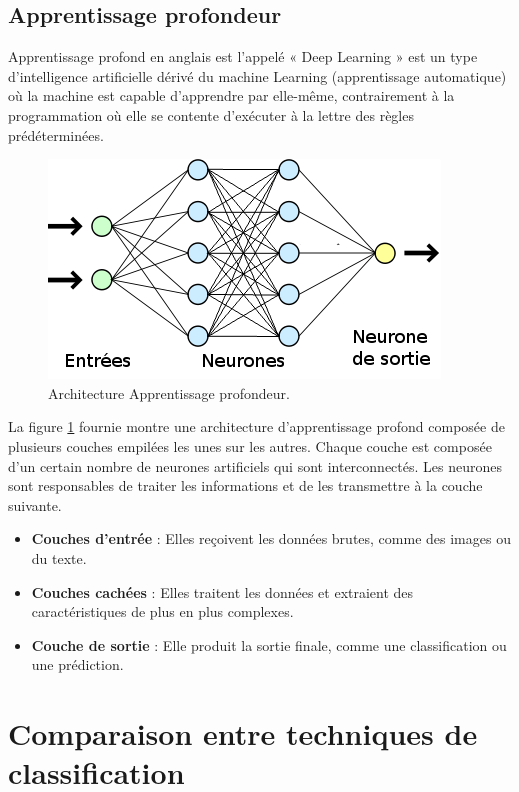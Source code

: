 \subsection{Apprentissage profondeur }
Apprentissage profond en anglais est l'appelé « Deep Learning » est un type d'intelligence artificielle dérivé du machine Learning (apprentissage automatique) où la machine est capable d'apprendre par elle-même, contrairement à la programmation où elle se contente d'exécuter à la lettre des règles prédéterminées.

\begin{figure}[h]
\centering
\includegraphics[scale=0.8]{Images/Chapiter2/Apprentissage profondeur.png}
\caption{Architecture Apprentissage profondeur.}
\label{fig:07}
\end{figure}

La figure \ref*{fig:07} fournie montre une architecture d'apprentissage profond composée de plusieurs couches empilées les unes sur les autres. Chaque couche est composée d'un certain nombre de neurones artificiels qui sont interconnectés. 
Les neurones sont responsables de traiter les informations et de les transmettre à la couche suivante.

\begin{itemize}
\item \textbf{Couches d'entrée} : Elles reçoivent les données brutes, comme des images ou du texte.
\item \textbf{Couches cachées} : Elles traitent les données et extraient des caractéristiques de plus en plus complexes.
\item \textbf{Couche de sortie} : Elle produit la sortie finale, comme une classification ou une prédiction.
\end{itemize}

\newpage
\section{Comparaison entre techniques de classification}

